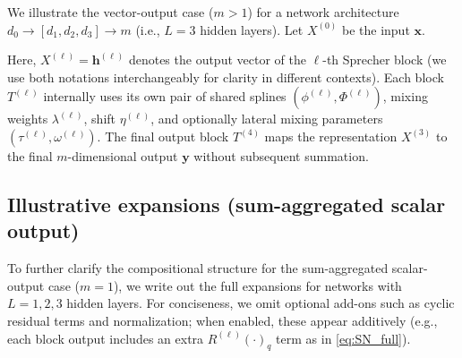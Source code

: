 \documentclass{article}
\theoremstyle{plain}
\theoremstyle{definition}
\theoremstyle{remark}
\begin{document}
We illustrate the vector-output case ($m>1$) for a network architecture $d_0\to[d_1,d_2,d_3]\to m$ (i.e., $L=3$ hidden layers). Let $X^{(0)}$ be the input $\mathbf{x}$.
\begin{center}
\end{center}
Here, $X^{(\ell)} = \mathbf{h}^{(\ell)}$ denotes the output vector of the $\ell$-th Sprecher block (we use both notations interchangeably for clarity in different contexts). Each block $T^{(\ell)}$ internally uses its own pair of shared splines $(\phi^{(\ell)}, \Phi^{(\ell)})$, mixing weights $\lambda^{(\ell)}$, shift $\eta^{(\ell)}$, and optionally lateral mixing parameters $(\tau^{(\ell)}, \omega^{(\ell)})$. The final output block $T^{(4)}$ maps the representation $X^{(3)}$ to the final $m$-dimensional output $\mathbf{y}$ without subsequent summation.

\subsection{Illustrative expansions (sum-aggregated scalar output)}
To further clarify the compositional structure for the sum-aggregated scalar-output case ($m=1$), we write out the full expansions for networks with $L=1, 2, 3$ hidden layers. For conciseness, we omit optional add-ons such as cyclic residual terms and normalization; when enabled, these appear additively (e.g., each block output includes an extra $R^{(\ell)}(\cdot)_q$ term as in \eqref{eq:SN_full}).
\end{document}
